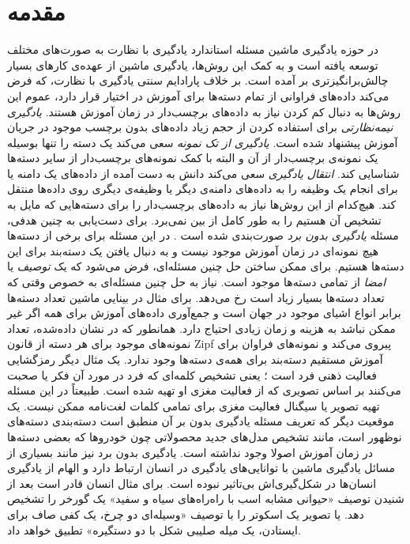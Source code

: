 \chapter{مقدمه } \label{intro}

 در حوزه یادگیری ماشین مسئله استاندارد یادگیری با نظارت به صورت‌های مختلف توسعه یافته است و به کمک این روش‌ها، یادگیری ماشین از عهده‌ی کارهای بسیار چالش‌برانگیزتری بر آمده است. بر خلاف پارادایم سنتی یادگیری با نظارت، که فرض می‌کند داده‌های فراوانی از تمام دسته‌ها برای آموزش در اختیار قرار دارد، عموم این روش‌ها به دنبال کم کردن نیاز به داده‌های برچسب‌دار در زمان آموزش هستند.
\emph{ یادگیری نیمه‌نظارتی}  \cite{chapel06}
برای استفاده کردن از حجم زیاد داده‌های بدون برچسب موجود در جریان آموزش پیشنهاد شده است.
\emph{یادگیری از تک نمونه}  \cite{miller12}
سعی می‌کند یک دسته را تنها بوسیله یک نمونه‌ی برچسب‌دار از آن و البته با کمک نمونه‌های برچسب‌دار از سایر دسته‌ها شناسایی کند.
\emph{ انتقال یادگیری}  \cite{pan10survey}
سعی می‌کند دانش به دست آمده از داده‌های یک دامنه یا برای انجام یک وظیفه را به داده‌های دامنه‌ی دیگر یا وظیفه‌ی دیگری روی داده‌ها منتقل کند.
هیچ‌کدام از این روش‌ها نیاز به داده‌های برچسب‌دار را برای دسته‌هایی که مایل به تشخیص آن هستیم را به طور کامل از بین نمی‌برد. برای دست‌یابی به چنین هدفی،
مسئله \textit{یادگیری بدون برد}  صورت‌بندی شده است \cite{bengio08}. در این مسئله برای برخی از دسته‌ها هیچ نمونه‌ای در زمان آموزش موجود نیست و به دنبال یافتن یک دسته‌بند برای این دسته‌ها هستیم. برای ممکن ساختن حل چنین مسئله‌ای، فرض می‌شود که یک \emph{ توصیف} یا \emph{امضا}  از تمامی دسته‌ها موجود است. نیاز به حل  چنین مسئله‌ای به خصوص وقتی که تعداد دسته‌ها بسیار زیاد است رخ می‌دهد. برای مثال در بینایی ماشین تعداد دسته‌ها برابر انواع اشیای موجود در جهان است و جمع‌آوری داده‌های آموزش برای همه اگر غیر ممکن نباشد به هزینه و زمان زیادی احتیاج دارد. همانطور که در
\cite{sala11}
نشان داده‌شده، تعداد نمونه‌های موجود برای هر دسته از قانون Zipf پیروی می‌کند و نمونه‌های فراوان برای آموزش مستقیم دسته‌بند برای همه‌ی دسته‌ها وجود ندارد.
 یک مثال دیگر رمزگشایی فعالیت ذهنی فرد است
\cite{hinton09}؛
یعنی تشخیص کلمه‌ای که فرد در مورد آن فکر یا صحبت می‌کنند بر اساس تصویری که از فعالیت مغزی او تهیه شده است. طبیعتاً در این مسئله تهیه تصویر یا سیگنال فعالیت مغزی برای تمامی کلمات لغت‌نامه ممکن نیست. یک موقعیت دیگر که تعریف مسئله یادگیری بدون بر آن منطبق است دسته‌بندی دسته‌های نوظهور است، مانند تشخیص مدل‌های جدید محصولاتی چون خودروها که بعضی دسته‌ها در زمان آموزش اصولا وجود نداشته است. یادگیری بدون برد نیز مانند بسیاری از مسائل یادگیری ماشین با توانایی‌های یادگیری در انسان ارتباط دارد و الهام از یادگیری انسان‌ها در شکل‌گیری‌اش بی‌تاثیر نبوده است. برای مثال انسان قادر است بعد از شنیدن توصیف «حیوانی مشابه اسب با راه‌راه‌های سیاه و سفید» یک گورخر را تشخیص دهد. یا تصویر یک اسکوتر را با توصیف «وسیله‌ای دو چرخ، یک کفی صاف برای ایستادن، یک میله صلیبی شکل با دو دستگیره» تطبیق خواهد داد.

